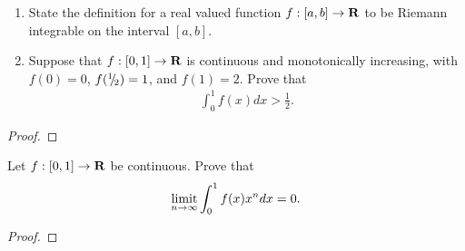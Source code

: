\documentclass[11pt,twoside,openany]{memoir}
\begin{document}
\newpage
\fancyhead[L]{\scalebox{0.9}{Integration}}
\fancyhead[R]{\scalebox{0.9}{Appeared on: F20}}
\begin{problem}
    \phantom{a}
    \begin{enumerate}[label = (\arabic*)]
        \item State the definition for a real valued function $f:[a,b] \rightarrow \mathbf{R}$ to be Riemann integrable on the interval $[a,b]$.
        \item Suppose that $f:[0,1] \rightarrow \mathbf{R}$ is continuous and monotonically increasing, with $f(0)=0$, $f({}^{1}\mskip -5mu/\mskip -3mu_{2}) = 1$, and $f(1) = 2$. Prove that 
            \begin{equation*}
            \begin{split}
                \int_{0}^1 f(x)dx > \frac{1}{2}.
            \end{split}
            \end{equation*}
    \end{enumerate}
\end{problem}
\begin{proof}
\end{proof}

\newpage
\fancyhead[L]{\scalebox{0.9}{Integration}}
\fancyhead[R]{\scalebox{0.9}{Appeared on: W20}}
\begin{problem}
    Let $f:[0,1] \rightarrow \mathbf{R}$ be continuous. Prove that 
        \begin{equation*}
        \begin{split}
            \operatorname*{limit}_{n \rightarrow \infty} \int_0^1 f(x) x^n dx = 0.
        \end{split}
        \end{equation*}
\end{problem}
\begin{proof}
\end{proof}
\end{document}
